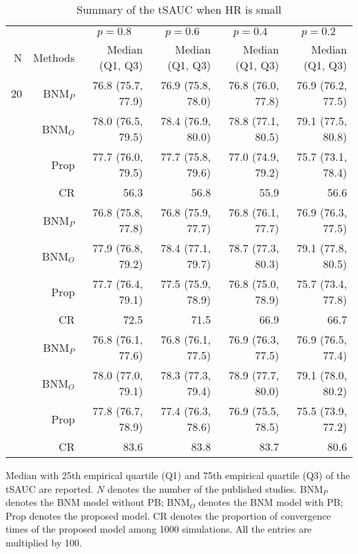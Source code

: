 \begin{table}[!htb]

\caption{\label{tab:sauc.med.1}Summary of the tSAUC when HR is small}
\centering
\begin{threeparttable}
\begin{tabular}[t]{rrrrrr}
\toprule
\multicolumn{1}{c}{} & \multicolumn{1}{c}{} & \multicolumn{1}{c}{$p = 0.8$} & \multicolumn{1}{c}{$p = 0.6$} & \multicolumn{1}{c}{$p = 0.4$} & \multicolumn{1}{c}{$p = 0.2$} \\
\cmidrule(l{3pt}r{3pt}){3-3} \cmidrule(l{3pt}r{3pt}){4-4} \cmidrule(l{3pt}r{3pt}){5-5} \cmidrule(l{3pt}r{3pt}){6-6}
N & Methods & Median (Q1, Q3) & Median (Q1, Q3) & Median (Q1, Q3) & Median (Q1, Q3)\\
\midrule
20 & BNM$_P$ & 76.8 (75.7, 77.9) & 76.9 (75.8, 78.0) & 76.8 (76.0, 77.8) & 76.9 (76.2, 77.5)\\
 & BNM$_O$ & 78.0 (76.5, 79.5) & 78.4 (76.9, 80.0) & 78.8 (77.1, 80.5) & 79.1 (77.5, 80.8)\\
 & Prop & 77.7 (76.0, 79.5) & 77.7 (75.8, 79.6) & 77.0 (74.9, 79.2) & 75.7 (73.1, 78.4)\\
 & CR & 56.3 & 56.8 & 55.9 & 56.6\\
\addlinespace
30 & BNM$_P$ & 76.8 (75.8, 77.8) & 76.8 (75.9, 77.7) & 76.8 (76.1, 77.7) & 76.9 (76.3, 77.5)\\
 & BNM$_O$ & 77.9 (76.8, 79.2) & 78.4 (77.1, 79.7) & 78.7 (77.3, 80.3) & 79.1 (77.8, 80.5)\\
 & Prop & 77.7 (76.4, 79.1) & 77.5 (75.9, 78.9) & 76.8 (75.0, 78.9) & 75.7 (73.4, 77.8)\\
 & CR & 72.5 & 71.5 & 66.9 & 66.7\\
\addlinespace
50 & BNM$_P$ & 76.8 (76.1, 77.6) & 76.8 (76.1, 77.5) & 76.9 (76.3, 77.5) & 76.9 (76.5, 77.4)\\
 & BNM$_O$ & 78.0 (77.0, 79.1) & 78.3 (77.3, 79.4) & 78.9 (77.7, 80.0) & 79.1 (78.0, 80.2)\\
 & Prop & 77.8 (76.7, 78.9) & 77.4 (76.3, 78.6) & 76.9 (75.5, 78.5) & 75.5 (73.9, 77.2)\\
 & CR & 83.6 & 83.8 & 83.7 & 80.6\\
\bottomrule
\end{tabular}
\begin{tablenotes}
\item 
Median with 25th empirical quartile (Q1) and 75th empirical quartile (Q3) of the tSAUC are reported. 
$N$ denotes the number of the published studies. 
BNM$_P$ denotes the BNM model without PB; 
BNM$_O$ denotes the BNM model with PB;
Prop denotes the proposed model.
CR denotes the proportion of convergence times of the proposed model among 1000 simulations.
All the entries are multiplied by 100.
\end{tablenotes}
\end{threeparttable}
\end{table}
